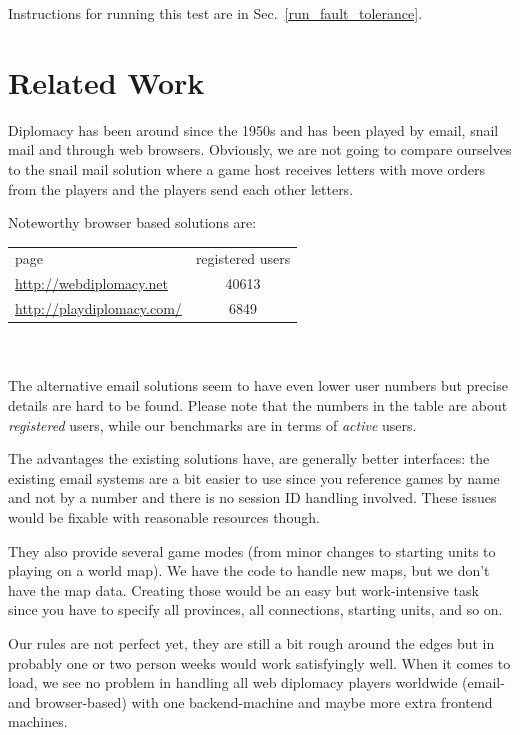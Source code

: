 \documentclass[11pt,a4paper]{report}
\newcommand{\hi}[1]{{\color{red}\em #1\/}\\}
\begin{document}
Instructions for running this test are in Sec.~\ref{run_fault_tolerance}.

\chapter{Related Work}


Diplomacy has been around since the 1950s and has been played by email, snail
mail and through web browsers. Obviously, we are not going to compare ourselves
to the snail mail solution where a game host receives letters with move orders
from the players and the players send each other letters.

Noteworthy browser based solutions are:\\

\begin{tabular}{lc}
  page                            & registered users \\
  \url{http://webdiplomacy.net}   & 40613 \\
  \url{http://playdiplomacy.com/} & 6849
\end{tabular}
\\
\\The alternative email solutions seem to have even lower user numbers but
precise details are hard to be found. Please note that the numbers in
the table are about {\em registered\/} users, while our benchmarks are in terms
of {\em active\/} users.

The advantages the existing solutions have, are generally better interfaces:
the existing email systems are a bit easier to use since you reference games by
name and not by a number and there is no session ID handling involved.
These issues would be fixable with reasonable resources though.

They also provide several game modes (from minor changes to starting units to
playing on a world map). We have the code to handle new maps, but we don't have
the map data. Creating those would be an easy but work-intensive task since
you have to specify all provinces, all connections, starting units, and so on.

Our rules are not perfect yet, they are still a bit rough around the edges but
in probably one or two person weeks would work satisfyingly well.
When it comes to load, we see no problem in handling all web diplomacy
players worldwide (email- and browser-based) with one backend-machine and maybe
more extra frontend machines.
\end{document}
